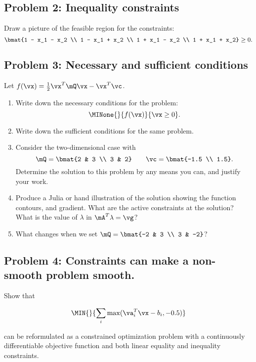 \documentclass[]{article}
\begin{document}
\hypertarget{problem-2-inequality-constraints}{%
\subsection{Problem 2: Inequality
constraints}\label{problem-2-inequality-constraints}}

Draw a picture of the feasible region for the constraints:
\[ \bmat{1 - x_1 - x_2 \\ 1 - x_1 + x_2 \\ 1 + x_1 - x_2 \\ 1 + x_1 + x_2} \ge 0. \]

\hypertarget{problem-3-necessary-and-sufficient-conditions}{%
\subsection{Problem 3: Necessary and sufficient
conditions}\label{problem-3-necessary-and-sufficient-conditions}}

Let \(f(\vx) = \frac{1}{2} \vx^T \mQ \vx - \vx^T \vc\).

\begin{enumerate}
\def\labelenumi{\arabic{enumi}.}
\item
  Write down the necessary conditions for the problem:
  \[ \MINone{}{f(\vx)}{\vx \ge 0}. \]
\item
  Write down the sufficient conditions for the same problem.
\item
  Consider the two-dimensional case with
  \[ \mQ = \bmat{2 & 3 \\ 3 & 2} \qquad \vc = \bmat{-1.5 \\ 1.5}. \]
  Determine the solution to this problem by any means you can, and
  justify your work.
\item
  Produce a Julia or hand illustration of the solution showing the
  function contours, and gradient. What are the active constraints at
  the solution? What is the value of \(\lambda\) in
  \(\mA^T \lambda = \vg\)?
\item
  What changes when we set \(\mQ = \bmat{-2 & 3 \\ 3 & -2}\)?
\end{enumerate}

\hypertarget{problem-4-constraints-can-make-a-non-smooth-problem-smooth.}{%
\subsection{Problem 4: Constraints can make a non-smooth problem
smooth.}\label{problem-4-constraints-can-make-a-non-smooth-problem-smooth.}}

Show that

\[ \MIN{}{\sum_i \max (\va_i^T \vx - b_i, -0.5)} \]

can be reformulated as a constrained optimization problem with a
continuously differentiable objective function and both linear equality
and inequality constraints.
\end{document}
